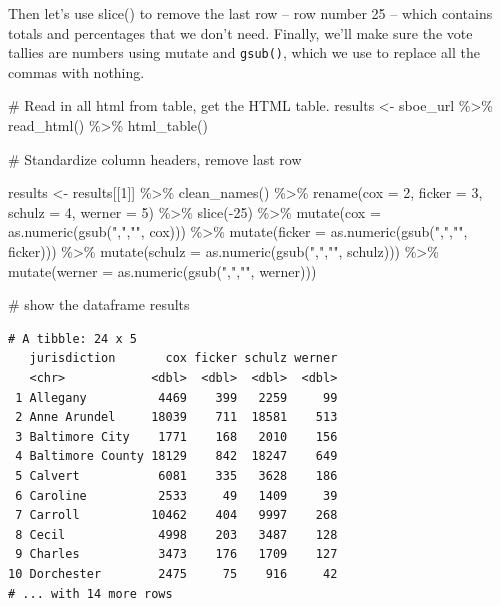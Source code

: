 \documentclass[
  letterpaper,
  DIV=11,
  numbers=noendperiod]{scrreprt}
\newenvironment{Shaded}{\begin{snugshade}}{\end{snugshade}}
\newcommand{\AttributeTok}[1]{\textcolor[rgb]{0.40,0.45,0.13}{#1}}
\newcommand{\CommentTok}[1]{\textcolor[rgb]{0.37,0.37,0.37}{#1}}
\newcommand{\DecValTok}[1]{\textcolor[rgb]{0.68,0.00,0.00}{#1}}
\newcommand{\FunctionTok}[1]{\textcolor[rgb]{0.28,0.35,0.67}{#1}}
\newcommand{\NormalTok}[1]{\textcolor[rgb]{0.00,0.23,0.31}{#1}}
\newcommand{\OtherTok}[1]{\textcolor[rgb]{0.00,0.23,0.31}{#1}}
\newcommand{\SpecialCharTok}[1]{\textcolor[rgb]{0.37,0.37,0.37}{#1}}
\newcommand{\StringTok}[1]{\textcolor[rgb]{0.13,0.47,0.30}{#1}}
\begin{document}
Then let's use slice() to remove the last row -- row number 25 -- which
contains totals and percentages that we don't need. Finally, we'll make
sure the vote tallies are numbers using mutate and \texttt{gsub()},
which we use to replace all the commas with nothing.

\begin{Shaded}
\begin{Highlighting}[]
\CommentTok{\# Read in all html from table, get the HTML table.}
\NormalTok{results }\OtherTok{\textless{}{-}}\NormalTok{ sboe\_url }\SpecialCharTok{\%\textgreater{}\%}
  \FunctionTok{read\_html}\NormalTok{() }\SpecialCharTok{\%\textgreater{}\%}
  \FunctionTok{html\_table}\NormalTok{()}

\CommentTok{\# Standardize column headers, remove last row}

\NormalTok{results }\OtherTok{\textless{}{-}}\NormalTok{ results[[}\DecValTok{1}\NormalTok{]] }\SpecialCharTok{\%\textgreater{}\%}
  \FunctionTok{clean\_names}\NormalTok{() }\SpecialCharTok{\%\textgreater{}\%} 
  \FunctionTok{rename}\NormalTok{(}\AttributeTok{cox =} \DecValTok{2}\NormalTok{, }\AttributeTok{ficker =} \DecValTok{3}\NormalTok{, }\AttributeTok{schulz =} \DecValTok{4}\NormalTok{, }\AttributeTok{werner =} \DecValTok{5}\NormalTok{) }\SpecialCharTok{\%\textgreater{}\%} 
  \FunctionTok{slice}\NormalTok{(}\SpecialCharTok{{-}}\DecValTok{25}\NormalTok{) }\SpecialCharTok{\%\textgreater{}\%} 
  \FunctionTok{mutate}\NormalTok{(}\AttributeTok{cox =} \FunctionTok{as.numeric}\NormalTok{(}\FunctionTok{gsub}\NormalTok{(}\StringTok{","}\NormalTok{,}\StringTok{""}\NormalTok{, cox))) }\SpecialCharTok{\%\textgreater{}\%} 
  \FunctionTok{mutate}\NormalTok{(}\AttributeTok{ficker =} \FunctionTok{as.numeric}\NormalTok{(}\FunctionTok{gsub}\NormalTok{(}\StringTok{","}\NormalTok{,}\StringTok{""}\NormalTok{, ficker))) }\SpecialCharTok{\%\textgreater{}\%} 
  \FunctionTok{mutate}\NormalTok{(}\AttributeTok{schulz =} \FunctionTok{as.numeric}\NormalTok{(}\FunctionTok{gsub}\NormalTok{(}\StringTok{","}\NormalTok{,}\StringTok{""}\NormalTok{, schulz))) }\SpecialCharTok{\%\textgreater{}\%} 
  \FunctionTok{mutate}\NormalTok{(}\AttributeTok{werner =} \FunctionTok{as.numeric}\NormalTok{(}\FunctionTok{gsub}\NormalTok{(}\StringTok{","}\NormalTok{,}\StringTok{""}\NormalTok{, werner)))}


\CommentTok{\# show the dataframe}
\NormalTok{results}
\end{Highlighting}
\end{Shaded}

\begin{verbatim}
# A tibble: 24 x 5
   jurisdiction       cox ficker schulz werner
   <chr>            <dbl>  <dbl>  <dbl>  <dbl>
 1 Allegany          4469    399   2259     99
 2 Anne Arundel     18039    711  18581    513
 3 Baltimore City    1771    168   2010    156
 4 Baltimore County 18129    842  18247    649
 5 Calvert           6081    335   3628    186
 6 Caroline          2533     49   1409     39
 7 Carroll          10462    404   9997    268
 8 Cecil             4998    203   3487    128
 9 Charles           3473    176   1709    127
10 Dorchester        2475     75    916     42
# ... with 14 more rows
\end{verbatim}
\end{document}
